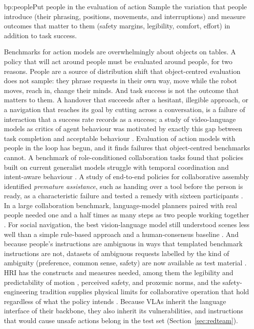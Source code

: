 \begin{practice}{bp:people}{Put people in the evaluation of action}
Sample the variation that people introduce (their phrasing, positions,
movements, and interruptions) and measure outcomes that matter to them
(safety margins, legibility, comfort, effort) in addition to task success.
\end{practice}

Benchmarks for action models are overwhelmingly about objects on tables. A
policy that will act around people must be evaluated around people, for two
reasons. People are a source of distribution shift that object-centred
evaluation does not sample: they phrase requests in their own way, move
while the robot moves, reach in, change their minds. And task success is not
the outcome that matters to them. A handover that succeeds after a hesitant,
illegible approach, or a navigation that reaches its goal by cutting across
a conversation, is a failure of interaction that a success rate records as a
success; a study of video-language models as critics of agent behaviour was
motivated by exactly this gap between task completion and acceptable
behaviour \cite{guan2024task}. Evaluation of action models with people in the loop has begun,
and it finds failures that object-centred benchmarks cannot. A benchmark of
role-conditioned collaboration tasks found that policies built on current
generalist models struggle with temporal coordination and intent-aware
behaviour \cite{liu2026hribench}. A study of end-to-end policies for
collaborative assembly identified \emph{premature assistance}, such as
handing over a tool before the person is ready, as a characteristic failure
and tested a remedy with sixteen participants \cite{xu2026learning}. In a
large collaboration benchmark, language-model planners paired with real
people needed one and a half times as many steps as two people working
together \cite{chang2025partnr}. For social navigation, the best
vision-language model still understood scenes less well than a simple
rule-based approach and a human-consensus baseline
\cite{munje2025socialnav}. And because people's instructions are
ambiguous in ways that templated benchmark instructions are not, datasets
of ambiguous requests labelled by the kind of ambiguity (preference, common
sense, safety) are now available as test material \cite{ivanova2025ambik}.
HRI has the constructs and measures needed,
among them the legibility and predictability of motion
\cite{dragan2013legibility}, perceived safety, and proxemic norms, and the
safety-engineering tradition supplies physical limits for collaborative
operation that hold regardless of what the policy intends
\cite{iso2016robots}. Because VLAs inherit the language interface of their
backbone, they also inherit its vulnerabilities, and instructions that would
cause unsafe actions belong in the test set (Section~\ref{sec:redteam}).

